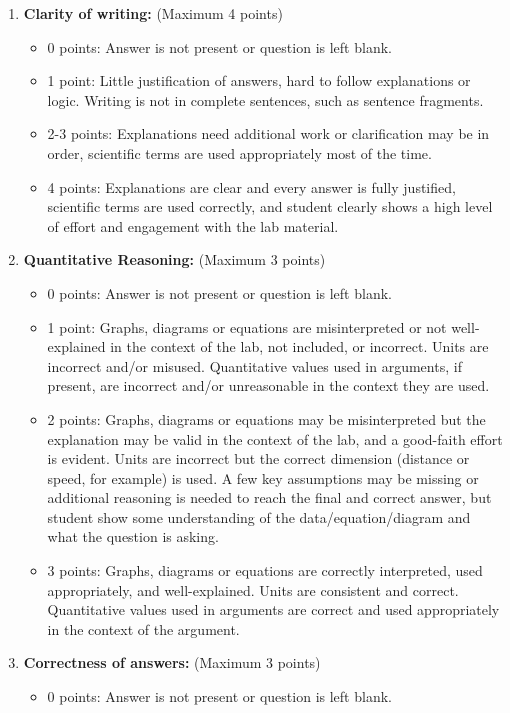 \documentclass[10pt]{article}
\begin{document}
\begin{enumerate}
\item \textbf{Clarity of writing:} (Maximum 4 points)
\begin{itemize}
    \item 0 points: Answer is not present or question is left blank.
	\item 1 point: Little justification of answers, hard to follow explanations or logic. Writing is not in complete sentences, such as sentence fragments.
	\item 2-3 points: Explanations need additional work or clarification may be in order, scientific terms are used appropriately most of the time. 
	\item 4 points: Explanations are clear and every answer is fully justified, scientific terms are used correctly, and student clearly shows a high level of effort and engagement with the lab material.
\end{itemize}
\item \textbf{Quantitative Reasoning:} (Maximum 3 points)
\begin{itemize}
    \item 0 points: Answer is not present or question is left blank.
	\item 1 point: Graphs, diagrams or equations are misinterpreted or not well-explained in the context of the lab, not included, or incorrect.  Units are incorrect and/or misused.  Quantitative values used in arguments, if present, are incorrect and/or unreasonable in the context they are used.  
	\item 2 points: Graphs, diagrams or equations may be misinterpreted but the explanation may be valid in the context of the lab, and a good-faith effort is evident.  Units are incorrect but the correct dimension (distance or speed, for example) is used. A few key assumptions may be missing or additional reasoning is needed to reach the final and correct answer, but student show some understanding of the data/equation/diagram and what the question is asking.
	\item 3 points: Graphs, diagrams or equations are correctly interpreted, used appropriately, and well-explained.  Units are consistent and correct.  Quantitative values used in arguments are correct and used appropriately in the context of the argument.
\end{itemize}
\item \textbf{Correctness of answers:} (Maximum 3 points)
\begin{itemize}
    \item 0 points: Answer is not present or question is left blank.

\end{itemize}
\end{enumerate}
\end{document}
